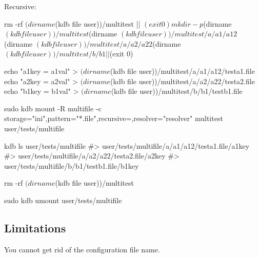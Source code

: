 Recursive\+:


\begin{DoxyCode}
rm -rf $(dirname $(kdb file user))/multitest || $(exit 0)
mkdir -p $(dirname $(kdb file user))/multitest $(dirname $(kdb file user))/multitest/a/a1/a12 $(dirname
       $(kdb file user))/multitest/a/a2/a22 $(dirname $(kdb file user))/multitest/b/b1|| $(exit 0)

echo "a1key = a1val" > $(dirname $(kdb file user))/multitest/a/a1/a12/testa1.file
echo "a2key = a2val" > $(dirname $(kdb file user))/multitest/a/a2/a22/testa2.file
echo "b1key = b1val" > $(dirname $(kdb file user))/multitest/b/b1/testb1.file

sudo kdb mount -R multifile -c storage="ini",pattern="*.file",recursive=,resolver="resolver" multitest
       user/tests/multifile

kdb ls user/tests/multifile
#> user/tests/multifile/a/a1/a12/testa1.file/a1key
#> user/tests/multifile/a/a2/a22/testa2.file/a2key
#> user/tests/multifile/b/b1/testb1.file/b1key

rm -rf $(dirname $(kdb file user))/multitest

sudo kdb umount user/tests/multifile
\end{DoxyCode}


\subsection*{Limitations}


\begin{DoxyItemize}
\item You cannot get rid of the configuration file name. 
\end{DoxyItemize}